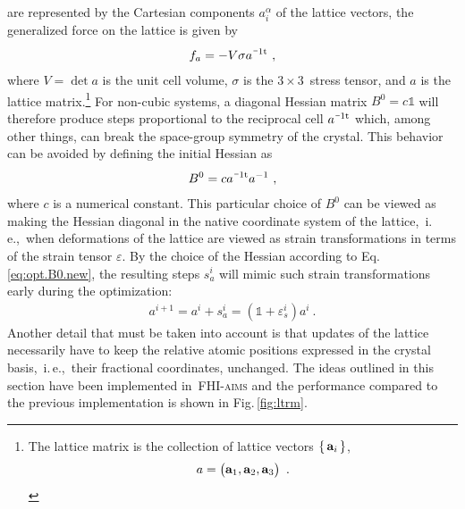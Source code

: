  are represented by the Cartesian components $a^\alpha_i$ of the lattice vectors, the generalized force on the lattice is given by
\begin{align}
f_a = - V \sigma \itp{a}~,
\end{align}
where $V = \det a$ is the unit cell volume, $\sigma$ is the $3 \times 3$~stress tensor, and $a$ is the lattice matrix.\footnote{The lattice matrix is the collection of lattice vectors $\set{{\bf a}_i}$,
	\begin{align}
	a = \begin{pmatrix} {\bf a}_1, {\bf a}_2, {\bf a}_3 \end{pmatrix}~.
	\end{align}
}
For non-cubic systems, a diagonal Hessian matrix $B^0 = c \mathds 1$ will therefore produce steps proportional to the reciprocal cell $\itp{a}$ which, among other things, can break the space-group symmetry of the crystal. This behavior can be avoided by defining the initial Hessian as
\begin{align}
B^0 = c \itp{a} a^{-1}~,
\label{eq:opt.B0.new}
\end{align}
where $c$ is a numerical constant. This particular choice of $B^0$ can be viewed as making the Hessian diagonal in the native coordinate system of the lattice,~i.\,e.,~when deformations of the lattice are viewed as strain transformations in terms of the strain tensor $\varepsilon$. By the choice of the Hessian according to Eq.\,\eqref{eq:opt.B0.new}, the resulting steps $s^i_a$ will mimic such strain transformations early during the optimization:
\begin{align}
a^{i + 1} = a^i + s_a^i = (\mathds 1 + \varepsilon_s^i) a^i~.
\end{align}
Another detail that must be taken into account is that updates of the lattice necessarily have to keep the relative atomic positions expressed in the crystal basis,~i.\,e.,~their fractional coordinates, unchanged. The ideas outlined in this section have been implemented in~\textsc{FHI-aims} and the performance compared to the previous implementation is shown in Fig.\,\ref{fig:ltrm}.
